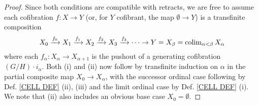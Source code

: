 \documentclass[a4paper,10pt]{article}%
\begin{document}
\begin{proof}
Since 
both conditions are compatible with retracts, we are free to assume each cofibration $f\colon X \to Y$
(or, for $Y$ cofibrant, the map $\emptyset \to Y$)
is a transfinite composition
\begin{equation}\label{TRANSFCOMP EQ}
	X_0 \xrightarrow{f_0} 
	X_1 \xrightarrow{f_1}
	X_2 \xrightarrow{f_2}
	X_3 \xrightarrow{f_3} 
	\cdots
	\to Y = X_{\beta} = \operatorname{colim}_{\alpha < \beta} X_{\alpha}
\end{equation}
where each $f_{\alpha} \colon X_{\alpha} \to X_{\alpha+1}$
is the pushout of a generating cofibration
$(G/H) \cdot i_{\alpha}$. Both (i) and (ii) now follow by transfinite induction on $\alpha$ in the partial composite map
$X_0 \to X_{\alpha}$, with the successor ordinal case following by Def. \ref{CELL DEF} (ii), (iii) and the limit ordinal case by
Def. \ref{CELL DEF} (i). We note that (ii) also includes an obvious base case $X_0=\emptyset$.
\end{proof}




\end{document}
